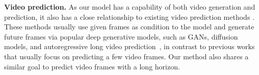 \vspace{0.02in}
\noindent\textbf{Video prediction.}
As our model has a capability of both video generation and prediction, it also has a close relationship to existing video prediction methods \citep{srivastava2015unsupervised,finn2016unsupervised,denton2017unsupervised,babaeizadeh2018stochastic,denton2018stochastic,lee2018stochastic,villegas2019high,kumar2020videoflow,franceschi2020stochastic,luc2020transformation,lee2021revisiting,seo2022autoregressive}. These methods usually use given frames as condition to the model and generate future frames via popular deep generative models, such as GANs, diffusion models, and autoregressive  long video prediction~\citep{harvey2022flexible,yan2023temporally}, in contrast to previous works that usually focus on predicting a few video frames. Our method also shares a similar goal to predict video frames with a long horizon.

